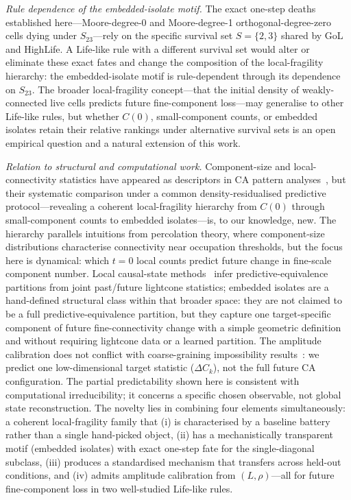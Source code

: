 \documentclass[aip,cha,preprint,nofootinbib]{revtex4-2}
\newcommand{\Ck}{\Delta C_k}
\begin{document}
\textit{Rule dependence of the embedded-isolate motif.}
The exact one-step deaths established here---Moore-degree-0 and
Moore-degree-1 orthogonal-degree-zero cells dying under $S_{23}$---rely
on the specific survival set $S=\{2,3\}$ shared by GoL and HighLife.
A Life-like rule with a different survival set would alter or eliminate
these exact fates and change the composition of the local-fragility
hierarchy: the embedded-isolate motif is rule-dependent through its
dependence on $S_{23}$.
The broader local-fragility concept---that the initial density of
weakly-connected live cells predicts future fine-component loss---may
generalise to other Life-like rules, but whether $C(0)$, small-component
counts, or embedded isolates retain their relative rankings under
alternative survival sets is an open empirical question and a natural
extension of this work.

\textit{Relation to structural and computational work.}
Component-size and local-connectivity statistics have appeared as descriptors
in CA pattern analyses~\cite{rupe2018}, but their systematic comparison under
a common density-residualised predictive protocol---revealing a coherent
local-fragility hierarchy from $C(0)$ through small-component counts to
embedded isolates---is, to our knowledge, new.
The hierarchy parallels intuitions from percolation theory, where
component-size distributions characterise connectivity near occupation
thresholds, but the focus here is dynamical: which $t{=}0$ local counts
predict future change in fine-scale component number.
Local causal-state methods~\cite{crutchfield1989,rupe2018} infer
predictive-equivalence partitions from joint past/future lightcone statistics;
embedded isolates are a hand-defined structural class within that broader space:
they are not claimed to be a full predictive-equivalence partition,
but they capture one target-specific component of future fine-connectivity
change with a simple geometric definition and without requiring lightcone
data or a learned partition.
The amplitude calibration does not conflict with coarse-graining impossibility
results~\cite{israeli2004}: we predict one low-dimensional target statistic
($\Ck$), not the full future CA configuration.
The partial predictability shown here is consistent with computational
irreducibility; it concerns a specific chosen observable, not global
state reconstruction.
The novelty lies in combining four elements simultaneously: a coherent
local-fragility family that (i) is characterised by a baseline battery
rather than a single hand-picked object, (ii) has a mechanistically
transparent motif (embedded isolates) with exact one-step fate for the
single-diagonal subclass, (iii) produces a standardised mechanism that
transfers across held-out conditions, and (iv) admits amplitude calibration
from $(L,\rho)$---all for future fine-component loss in two well-studied
Life-like rules.
\end{document}
